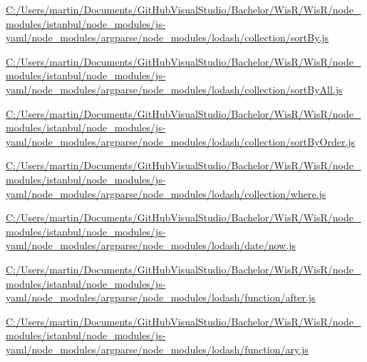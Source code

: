 \begin{DoxyCompactItemize}
\item 
\hyperlink{_c_1_2_users_2martin_2_documents_2_git_hub_visual_studio_2_bachelor_2_wis_r_2_wis_r_2node_modulee516393737479d31f22acf4aff3756b3}{C\+:/\+Users/martin/\+Documents/\+Git\+Hub\+Visual\+Studio/\+Bachelor/\+Wis\+R/\+Wis\+R/node\+\_\+modules/istanbul/node\+\_\+modules/js-\/yaml/node\+\_\+modules/argparse/node\+\_\+modules/lodash/collection/sort\+By.\+js}
\item 
\hyperlink{_c_1_2_users_2martin_2_documents_2_git_hub_visual_studio_2_bachelor_2_wis_r_2_wis_r_2node_module1c880301cba87cbea557285ccdc2d1a8}{C\+:/\+Users/martin/\+Documents/\+Git\+Hub\+Visual\+Studio/\+Bachelor/\+Wis\+R/\+Wis\+R/node\+\_\+modules/istanbul/node\+\_\+modules/js-\/yaml/node\+\_\+modules/argparse/node\+\_\+modules/lodash/collection/sort\+By\+All.\+js}
\item 
\hyperlink{_c_1_2_users_2martin_2_documents_2_git_hub_visual_studio_2_bachelor_2_wis_r_2_wis_r_2node_module632f58d855bd69b741808971828f40a0}{C\+:/\+Users/martin/\+Documents/\+Git\+Hub\+Visual\+Studio/\+Bachelor/\+Wis\+R/\+Wis\+R/node\+\_\+modules/istanbul/node\+\_\+modules/js-\/yaml/node\+\_\+modules/argparse/node\+\_\+modules/lodash/collection/sort\+By\+Order.\+js}
\item 
\hyperlink{_c_1_2_users_2martin_2_documents_2_git_hub_visual_studio_2_bachelor_2_wis_r_2_wis_r_2node_module3b81d267372e87b7042bafe9f538d7cf}{C\+:/\+Users/martin/\+Documents/\+Git\+Hub\+Visual\+Studio/\+Bachelor/\+Wis\+R/\+Wis\+R/node\+\_\+modules/istanbul/node\+\_\+modules/js-\/yaml/node\+\_\+modules/argparse/node\+\_\+modules/lodash/collection/where.\+js}
\item 
\hyperlink{_c_1_2_users_2martin_2_documents_2_git_hub_visual_studio_2_bachelor_2_wis_r_2_wis_r_2node_module689ab47e26aa9eade299f6e6e3dcef08}{C\+:/\+Users/martin/\+Documents/\+Git\+Hub\+Visual\+Studio/\+Bachelor/\+Wis\+R/\+Wis\+R/node\+\_\+modules/istanbul/node\+\_\+modules/js-\/yaml/node\+\_\+modules/argparse/node\+\_\+modules/lodash/date/now.\+js}
\item 
\hyperlink{_c_1_2_users_2martin_2_documents_2_git_hub_visual_studio_2_bachelor_2_wis_r_2_wis_r_2node_module7060d93eed0cfff7c6ea6189eee42c7d}{C\+:/\+Users/martin/\+Documents/\+Git\+Hub\+Visual\+Studio/\+Bachelor/\+Wis\+R/\+Wis\+R/node\+\_\+modules/istanbul/node\+\_\+modules/js-\/yaml/node\+\_\+modules/argparse/node\+\_\+modules/lodash/function/after.\+js}
\item 
\hyperlink{_c_1_2_users_2martin_2_documents_2_git_hub_visual_studio_2_bachelor_2_wis_r_2_wis_r_2node_module66fe72e857b9641b1528efb1aa1726d3}{C\+:/\+Users/martin/\+Documents/\+Git\+Hub\+Visual\+Studio/\+Bachelor/\+Wis\+R/\+Wis\+R/node\+\_\+modules/istanbul/node\+\_\+modules/js-\/yaml/node\+\_\+modules/argparse/node\+\_\+modules/lodash/function/ary.\+js}

\end{DoxyCompactItemize}
